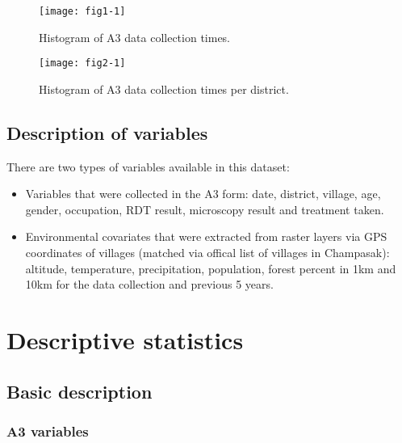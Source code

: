 \documentclass{article}\usepackage[]{graphicx}\usepackage[]{color}
\begin{document}
\begin{figure}
\begin{center}

\texttt{[image: fig1-1]}
\end{center}
\caption{Histogram of A3 data collection times.}
\label{fig:Histogram_Date}
\end{figure}

\begin{figure}
\begin{center}

\texttt{[image: fig2-1]}
\end{center}
\caption{Histogram of A3 data collection times per district.}
\label{fig:Histogram_Date_District}
\end{figure}

\subsection{Description of variables}
There are two types of variables available in this dataset:
\begin{itemize}
\item Variables that were collected in the A3 form: date, district, village, age, gender, occupation, RDT result, microscopy result and treatment taken.
\item Environmental covariates that were extracted from raster layers via GPS coordinates of villages (matched via offical list of villages in Champasak): altitude, temperature, precipitation, population, forest percent in 1km and 10km for the data collection and previous 5 years.
\end{itemize}


\section{Descriptive statistics}
\subsection{Basic description}
\subsubsection{A3 variables} 

\end{document}

